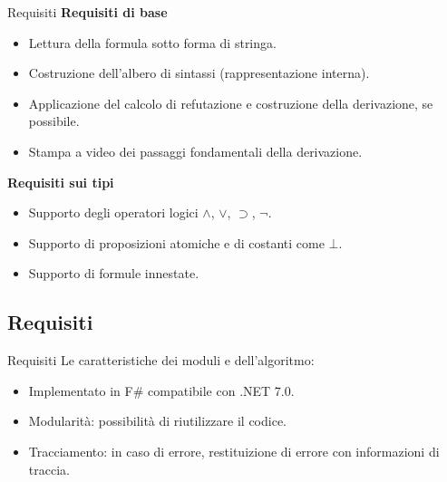 \documentclass{beamer}
\begin{document}
\begin{darkframes}
\begin{frame}{Requisiti}
        \textbf{Requisiti di base}
        \begin{itemize}
            \item Lettura della formula sotto forma di stringa.
            \item Costruzione dell'albero di sintassi (rappresentazione interna).
            \item Applicazione del calcolo di refutazione e costruzione della derivazione, se possibile.
            \item Stampa a video dei passaggi fondamentali della derivazione.
        \end{itemize}

        \textbf{Requisiti sui tipi}
        \begin{itemize}
            \item Supporto degli operatori logici $\land$, $\lor$, $\supset$, $\neg$.
            \item Supporto di proposizioni atomiche e di costanti come $\bot$.
            \item Supporto di formule innestate.
        \end{itemize}

    \end{frame}

    \subsection{Requisiti}
    \begin{frame}{Requisiti}
        Le caratteristiche dei moduli e dell'algoritmo:
        \begin{itemize}
            \item Implementato in F\# compatibile con .NET 7.0.
            \item Modularità: possibilità di riutilizzare il codice.
            \item Tracciamento: in caso di errore, restituizione di errore con informazioni di traccia.
        \end{itemize}
    \end{frame}


\end{darkframes}
\end{document}

